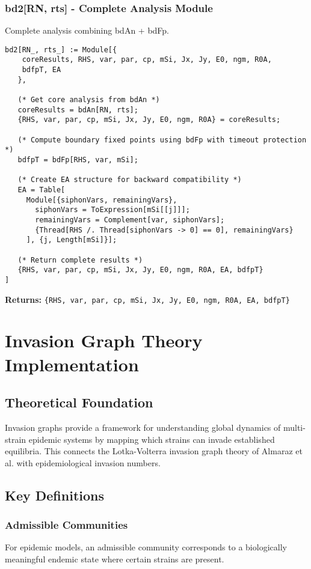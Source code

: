 \documentclass{article}
\begin{document}
\subsubsection{bd2[RN, rts] - Complete Analysis Module}
Complete analysis combining bdAn + bdFp.

\begin{lstlisting}
bd2[RN_, rts_] := Module[{
    coreResults, RHS, var, par, cp, mSi, Jx, Jy, E0, ngm, R0A,
    bdfpT, EA
   },

   (* Get core analysis from bdAn *)
   coreResults = bdAn[RN, rts];
   {RHS, var, par, cp, mSi, Jx, Jy, E0, ngm, R0A} = coreResults;

   (* Compute boundary fixed points using bdFp with timeout protection *)
   bdfpT = bdFp[RHS, var, mSi];

   (* Create EA structure for backward compatibility *)
   EA = Table[
     Module[{siphonVars, remainingVars},
       siphonVars = ToExpression[mSi[[j]]];
       remainingVars = Complement[var, siphonVars];
       {Thread[RHS /. Thread[siphonVars -> 0] == 0], remainingVars}
     ], {j, Length[mSi]}];

   (* Return complete results *)
   {RHS, var, par, cp, mSi, Jx, Jy, E0, ngm, R0A, EA, bdfpT}
]
\end{lstlisting}

\textbf{Returns:} \texttt{\{RHS, var, par, cp, mSi, Jx, Jy, E0, ngm, R0A, EA, bdfpT\}}

\section{Invasion Graph Theory Implementation}

\subsection{Theoretical Foundation}

Invasion graphs provide a framework for understanding global dynamics of multi-strain epidemic systems by mapping which strains can invade established equilibria. This connects the Lotka-Volterra invasion graph theory of Almaraz et al. with epidemiological invasion numbers.

\subsection{Key Definitions}

\subsubsection{Admissible Communities}
For epidemic models, an admissible community corresponds to a biologically meaningful endemic state where certain strains are present.
\end{document}
